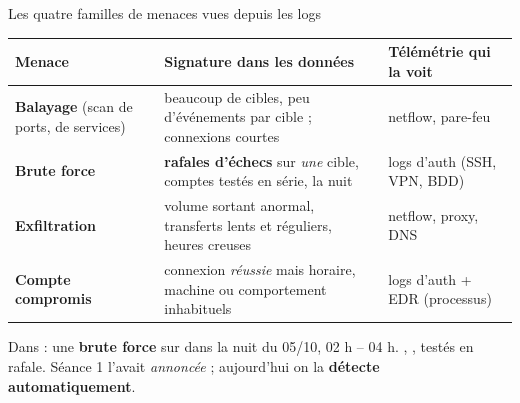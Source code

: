 \begin{frame}{Les quatre familles de menaces vues depuis les logs}
\begin{center}
\footnotesize
\begin{tabular}{@{}p{2.5cm}p{4.3cm}p{2.7cm}@{}}
\toprule
\textbf{Menace} & \textbf{Signature dans les données} & \textbf{Télémétrie qui la voit}\\
\midrule
\textbf{Balayage} (scan de ports, de services) & beaucoup de cibles, peu
d'événements par cible ; connexions courtes & netflow, pare-feu\\
\addlinespace[1pt]
\textbf{Brute force} & \textbf{rafales d'échecs} sur \emph{une} cible,
comptes testés en série, la nuit & logs d'auth (SSH, VPN, BDD)\\
\addlinespace[1pt]
\textbf{Exfiltration} & volume sortant anormal, transferts lents et réguliers,
heures creuses & netflow, proxy, DNS\\
\addlinespace[1pt]
\textbf{Compte compromis} & connexion \emph{réussie} mais horaire, machine ou
comportement inhabituels & logs d'auth + EDR (processus)\\
\bottomrule
\end{tabular}
\end{center}
\vspace{1mm}
\begin{kbox}
Dans  : une \textbf{brute force} sur 
dans la nuit du 05/10, 02 h -- 04 h. , , 
testés en rafale. Séance 1 l'avait \emph{annoncée} ; aujourd'hui on la
\textbf{détecte automatiquement}.
\end{kbox}
\end{frame}

